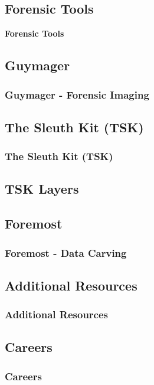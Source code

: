 \documentclass{beamer}
\begin{document}
\begin{frame}%
	\section{Forensic Tools}
	\begin{center}
		\Huge\textbf{Forensic Tools}
	\end{center}
\end{frame}

\begin{frame}
	\subsection*{Guymager}
	\frametitle{Guymager - Forensic Imaging}
\end{frame}

\begin{frame}
	\subsection*{The Sleuth Kit (TSK)}
	\frametitle{The Sleuth Kit (TSK)}
		\subsection*{TSK Layers}
\end{frame}

\begin{frame}
	\subsection*{Foremost}
	\frametitle{Foremost - Data Carving}
\end{frame}


\begin{frame}
	\section{Additional Resources}
	\frametitle{Additional Resources}
	
\end{frame}

\begin{frame}
	\section{Careers}
	\frametitle{Careers}
	
\end{frame}
\end{document}
